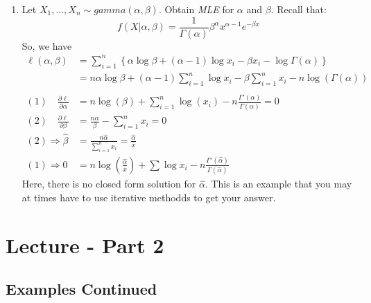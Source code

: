 \documentclass{article}
\begin{document}
\begin{enumerate}
    \item Let $X_1,...,X_n \sim gamma(\alpha,\beta)$. Obtain \textit{MLE} for $\alpha$ and $\beta$. Recall that:
    \begin{equation*}
        f(X|\alpha,\beta) = \frac{1}{\Gamma(\alpha)} \beta^\alpha x^{\alpha-1} e^{-\beta x}
    \end{equation*}
    So, we have
    \begin{equation*}
        \begin{split}
            \ell (\alpha,\beta) &= \sum_{i=1}^n \left\{\alpha\log\beta + (\alpha-1)\log x_i - \beta x_i - \log\Gamma(\alpha) \right\}\\
            &= n\alpha\log\beta + (\alpha-1)\sum_{i=1}^n \log x_i - \beta\sum_{i=1}^n x_i - n\log\left(\Gamma(\alpha)\right)\\
            \\
           (1)\quad \frac{\partial\ell}{\partial\alpha} &= n\log(\beta) + \sum_{i=1}^n \log (x_i) - n\frac{\Gamma'(\alpha)}{\Gamma(\alpha)} = 0\\
            (2) \quad \frac{\partial\ell}{\partial\beta} &= \frac{n\alpha}{\beta} - \sum_{i=1}^n x_i =0\\
            (2) \Rightarrow \hat{\beta} &= \frac{n\hat{\alpha}}{\sum_{i=1}^n x_i} = \frac{\hat{\alpha}}{\overline{x}}\\
            (1) \Rightarrow  0 &= n\log\left(\frac{\hat{\alpha}}{\overline{x}}\right) + \sum \log x_i - n\frac{\Gamma'(\hat{\alpha})}{\Gamma(\hat{\alpha})} 
        \end{split}
    \end{equation*}
    Here, there is no closed form solution for $\hat{\alpha}$. This is an example that you may at times have to use iterative methodds to get your answer.
\end{enumerate}

\section{Lecture - Part 2}

\subsection{Examples Continued}
\end{document}
